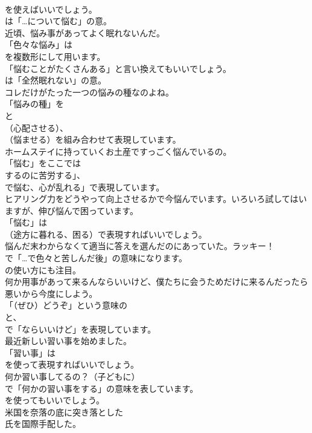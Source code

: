 \documentclass[8pt]{extreport}
\begin{document}
\begin{CJK}{UTF8}{min}
\\	を使えばいいでしょう。
\\	は「…について悩む」の意。	
\\	近頃、悩み事があってよく眠れないんだ。 
\\	「色々な悩み」は
\\	を複数形にして用います。
\\	「悩むことがたくさんある」と言い換えてもいいでしょう。
\\	は「全然眠れない」の意。	
\\	コレだけがたった一つの悩みの種なのよね。 
\\	「悩みの種」を 
\\	と 
\\	（心配させる）、
\\	（悩ませる）を組み合わせて表現しています。	
\\	ホームステイに持っていくお土産ですっごく悩んでいるの。 
\\	「悩む」をここでは
\\	するのに苦労する」、
\\	で悩む、心が乱れる」で表現しています。	
\\	ヒアリング力をどうやって向上させるかで今悩んでいます。いろいろ試してはいますが、伸び悩んで困っています。 
\\	「悩む」は 
\\	（途方に暮れる、困る）で表現すればいいでしょう。	
\\	悩んだ末わからなくて適当に答えを選んだのにあっていた。ラッキー！ 
\\	で「…で色々と苦しんだ後」の意味になります。
\\	の使い方にも注目。	
\\	何か用事があって来るんならいいけど、僕たちに会うためだけに来るんだったら悪いから今度にしよう。 
\\	「（ぜひ）どうぞ」という意味の
\\	と、
\\	で「ならいいけど」を表現しています。	
\\	最近新しい習い事を始めました。 
\\	「習い事」は
\\	を使って表現すればいいでしょう。	
\\	何か習い事してるの？（子どもに） 
\\	で「何かの習い事をする」の意味を表しています。
\\	を使ってもいいでしょう。	
\\	米国を奈落の底に突き落とした
\\	氏を国際手配した。 

\end{CJK}
\end{document}
